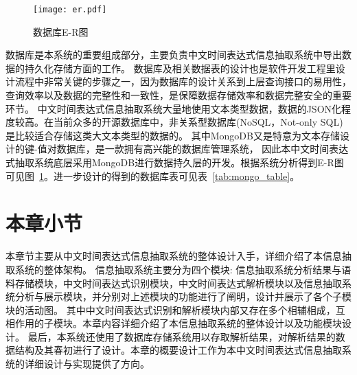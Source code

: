 \begin{figure}[h]
  \centering
  \texttt{[image: er.pdf]}
  \caption{数据库E-R图}
  \label{fig:er_graph}
\end{figure}

数据库是本系统的重要组成部分，主要负责中文时间表达式信息抽取系统中导出数据的持久化存储方面的工作。
数据库及相关数据表的设计也是软件开发工程里设计流程中非常关键的步骤之一，因为数据库的设计关系到上层查询接口的易用性，查询效率以及数据的完整性和一致性，是保障数据存储效率和数据完整安全的重要环节。
中文时间表达式信息抽取系统大量地使用文本类型数据，数据的JSON化程度较高。在当前众多的开源数据库中，非关系型数据库(NoSQL，Not-only SQL)是比较适合存储这类大文本类型的数据的。
其中MongoDB又是特意为文本存储设计的键-值对数据库，是一款拥有高兴能的数据库管理系统，
因此本中文时间表达式抽取系统底层采用MongoDB进行数据持久层的开发。根据系统分析得到E-R图可见图~\ref{fig:er_graph}。进一步设计的得到的数据库表可见表~\ref{tab:mongo_table}。

\section{本章小节}

本章节主要从中文时间表达式信息抽取系统的整体设计入手，详细介绍了本信息抽取系统的整体架构。
信息抽取系统主要分为四个模块: 信息抽取系统分析结果与语料存储模块，中文时间表达式识别模块，中文时间表达式解析模块以及信息抽取系统分析与展示模块，并分别对上述模块的功能进行了阐明，设计并展示了各个子模块的活动图。
其中中文时间表达式识别和解析模块内部又存在多个相辅相成，互相作用的子模块。本章内容详细介绍了本信息抽取系统的整体设计以及功能模块设计。
最后，本系统还使用了数据库存储系统用以存取解析结果，对解析结果的数据结构及其春初进行了设计。本章的概要设计工作为本中文时间表达式信息抽取系统的详细设计与实现提供了方向。
